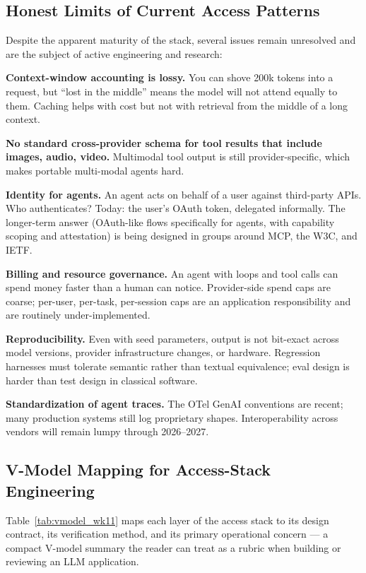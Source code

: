 \subsection{Honest Limits of Current Access Patterns}

Despite the apparent maturity of the stack, several issues
remain unresolved and are the subject of active engineering and
research:

\textbf{Context-window accounting is lossy.} You can shove 200k
tokens into a request, but ``lost in the middle''
\citep{liu2024lost} means the model will not attend equally to
them. Caching helps with cost but not with retrieval from the
middle of a long context.

\textbf{No standard cross-provider schema for tool results that
include images, audio, video.} Multimodal tool output is still
provider-specific, which makes portable multi-modal agents hard.

\textbf{Identity for agents.} An agent acts on behalf of a user
against third-party APIs. Who authenticates? Today: the user's
OAuth token, delegated informally. The longer-term answer
(OAuth-like flows specifically for agents, with capability
scoping and attestation) is being designed in groups around MCP,
the W3C, and IETF.

\textbf{Billing and resource governance.} An agent with loops
and tool calls can spend money faster than a human can notice.
Provider-side spend caps are coarse; per-user, per-task,
per-session caps are an application responsibility and are
routinely under-implemented.

\textbf{Reproducibility.} Even with seed parameters, output is
not bit-exact across model versions, provider infrastructure
changes, or hardware. Regression harnesses must tolerate
semantic rather than textual equivalence; eval design is harder
than test design in classical software.

\textbf{Standardization of agent traces.} The OTel GenAI
conventions are recent; many production systems still log
proprietary shapes. Interoperability across vendors will remain
lumpy through 2026--2027.

\subsection{V-Model Mapping for Access-Stack Engineering}

Table~\ref{tab:vmodel_wk11} maps each layer of the access stack
to its design contract, its verification method, and its primary
operational concern --- a compact V-model summary the reader can
treat as a rubric when building or reviewing an LLM application.

